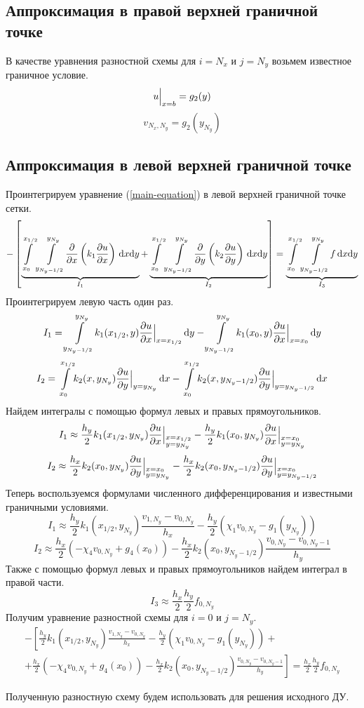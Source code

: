 \subsection{Аппроксимация в правой верхней граничной точке}
В качестве уравнения разностной схемы для $i = N_x$ и $j = N_y$ возьмем
известное граничное условие.
\[ u \Big\vert_{x = b} = g_2(y) \]
\[ v_{N_x,N_y} = g_2(y_{N_y}) \]

\subsection{Аппроксимация в левой верхней граничной точке}
Проинтегрируем уравнение (\ref{main-equation}) в левой верхней граничной точке сетки.
\[
  - \left[
  \underbrace{ \int\limits_{x_{0}}^{x_{1/2}}\int\limits_{y_{N_y-1/2}}^{y_{N_y}} \! \pdv{x}\left( k_1 \pdv{u}{x} \right) \, \dd x \dd y }_{I_1} +
  \underbrace{ \int\limits_{x_{0}}^{x_{1/2}}\int\limits_{y_{N_y-1/2}}^{y_{N_y}} \! \pdv{y}\left( k_2 \pdv{u}{y} \right) \, \dd x \dd y }_{I_2}
  \right] =
  \underbrace{ \int\limits_{x_{0}}^{x_{1/2}}\int\limits_{y_{N_y-1/2}}^{y_{N_y}} \! f \, \dd x \dd y }_{I_3}
\]
Проинтегрируем левую часть один раз.
\[ I_1 = \int\limits_{y_{N_y-1/2}}^{y_{N_y}} \! k_1(x_{1/2},y) \pdv{u}{x} \Big\vert_{x = x_{1/2}} \, \dd y - \int\limits_{y_{N_y-1/2}}^{y_{N_y}} \! k_1(x_{0},y) \pdv{u}{x} \Big\vert_{x = x_{0}} \, \dd y \]
\[ I_2 = \int\limits_{x_{0}}^{x_{1/2}} \! k_2(x,y_{N_y}) \pdv{u}{y} \Big\vert_{y = y_{N_y}} \, \dd x - \int\limits_{x_{0}}^{x_{1/2}} \! k_2(x,y_{N_y-1/2}) \pdv{u}{y} \Big\vert_{y = y_{N_y-1/2}} \, \dd x \]
Найдем интегралы с помощью формул левых и правых прямоугольников.
\[ I_1 \approx \frac{h_y}{2} k_1(x_{1/2},y_{N_y}) \pdv{u}{x} \Big\vert_{\begin{subarray}{l} x = x_{1/2} \\ y = y_{N_y} \end{subarray}} - \frac{h_y}{2} k_1(x_{0},y_{N_y}) \pdv{u}{x} \Big\vert_{\begin{subarray}{l} x = x_{0} \\ y = y_{N_y} \end{subarray}} \]
\[ I_2 \approx \frac{h_x}{2} k_2(x_{0},y_{N_y}) \pdv{u}{y} \Big\vert_{\begin{subarray}{l} x = x_{0} \\ y = y_{N_y} \end{subarray}} - \frac{h_x}{2} k_2(x_{0},y_{N_y-1/2}) \pdv{u}{y} \Big\vert_{\begin{subarray}{l} x = x_{0} \\ y = y_{N_y-1/2} \end{subarray}} \]
Теперь воспользуемся формулами численного дифференцирования и известными граничными условиями.
\[ I_1 \approx \frac{h_y}{2} k_1(x_{1/2},y_{N_y}) \frac{v_{1,N_y} - v_{0,N_y}}{h_x} - \frac{h_y}{2} \left( \chi_1 v_{0,N_y} - g_1(y_{N_y}) \right) \]
\[ I_2 \approx \frac{h_x}{2} \left( - \chi_4 v_{0,N_y} + g_4(x_0) \right) - \frac{h_x}{2} k_2(x_{0},y_{N_y-1/2}) \frac{v_{0,N_y} - v_{0,N_y-1}}{h_y} \]
Также с помощью формул левых и правых прямоугольников найдем интеграл в правой части.
\[ I_3 \approx \frac{h_x}{2} \frac{h_y}{2} f_{0,N_y} \]
Получим уравнение разностной схемы для $i = 0$ и $j = N_y$.
\begin{multline*}
  - \left[
  \frac{h_y}{2} k_1(x_{1/2},y_{N_y}) \frac{v_{1,N_y} - v_{0,N_y}}{h_x} - \frac{h_y}{2} \left( \chi_1 v_{0,N_y} - g_1(y_{N_y}) \right) + \right. \\
  \left. +
  \frac{h_x}{2} \left( - \chi_4 v_{0,N_y} + g_4(x_0) \right) - \frac{h_x}{2} k_2(x_{0},y_{N_y-1/2}) \frac{v_{0,N_y} - v_{0,N_y-1}}{h_y}
  \right] =
  \frac{h_x}{2} \frac{h_y}{2} f_{0,N_y}
\end{multline*}

Полученную разностную схему будем использовать для решения исходного ДУ.
